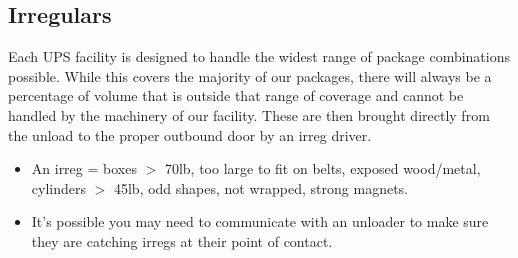 \documentclass[12pt]{article}
\begin{document}
\clearpage
\subsection{Irregulars}
Each UPS facility is designed to handle the widest range of package combinations possible. While this covers the majority of our packages, there will always be a percentage of volume that is outside that range of coverage and cannot be handled by the machinery of our facility. These are then brought directly from the unload to the proper outbound door by an irreg driver. 

\begin{itemize}
    \item An irreg = boxes $>$ 70lb, too large to fit on belts, exposed wood/metal, cylinders $>$ 45lb, odd shapes, not wrapped, strong magnets.
    \item It's possible you may need to communicate with an unloader to make sure they are catching irregs at their point of contact.
\end{itemize}
\end{document}
